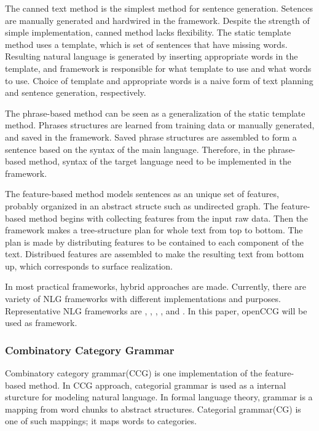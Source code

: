 \documentclass{sig-alternate}
\begin{document}
The canned text method is the simplest method for sentence generation. Setences are manually generated and hardwired in the framework. Despite the strength of simple implementation, canned method lacks flexibility. The static template method uses a template, which is set of sentences that have missing words. Resulting natural language is generated by inserting appropriate words in the template, and framework is responsible for what template to use and what words to use. Choice of template and appropriate words is a naive form of text planning and sentence generation, respectively. 

The phrase-based method can be seen as a generalization of the static template method. Phrases structures are learned from training data or manually generated, and saved in the framework. Saved phrase structures are assembled to form a sentence based on the syntax of the main language. Therefore, in the phrase-based method, syntax of the target language need to be implemented in the framework. 

The feature-based method models sentences as an unique set of features, probably organized in an abstract structe such as undirected graph. The feature-based method begins with collecting features from the input raw data. Then the framework makes a tree-structure plan for whole text from top to bottom. The plan is made by distributing features to be contained to each component of the text. Distribued features are assembled to make the resulting text from bottom up, which corresponds to surface realization. 

In most practical frameworks, hybrid approaches are made. Currently, there are variety of NLG frameworks with different implementations and purposes. Representative NLG frameworks are \cite{geni}, \cite{kpml}, \cite{clint}, \cite{naturalowl}, and \cite{openccg}. In this paper, openCCG will be used as framework. 


\subsubsection{Combinatory Category Grammar} 

Combinatory category grammar(CCG) is one implementation of the feature-based method. In CCG approach, categorial grammar is used as a internal sturcture for modeling natural language. In formal language theory, grammar is a mapping from word chunks to abstract structures. Categorial grammar(CG) is one of such mappings; it maps words to categories. 
\end{document}
